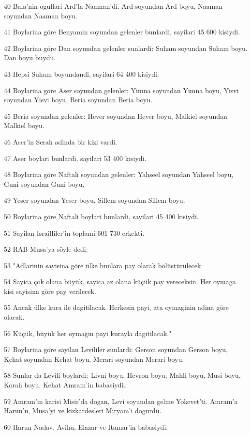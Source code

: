 \par 40 Bala'nin ogullari Ard'la Naaman'di. Ard soyundan Ard boyu, Naaman soyundan Naaman boyu.
\par 41 Boylarina göre Benyamin soyundan gelenler bunlardi, sayilari 45 600 kisiydi.
\par 42 Boylarina göre Dan soyundan gelenler sunlardi: Suham soyundan Suham boyu. Dan boyu buydu.
\par 43 Hepsi Suham boyundandi, sayilari 64 400 kisiydi.
\par 44 Boylarina göre Aser soyundan gelenler: Yimna soyundan Yimna boyu, Yisvi soyundan Yisvi boyu, Beria soyundan Beria boyu.
\par 45 Beria soyundan gelenler: Hever soyundan Hever boyu, Malkiel soyundan Malkiel boyu.
\par 46 Aser'in Serah adinda bir kizi vardi.
\par 47 Aser boylari bunlardi, sayilari 53 400 kisiydi.
\par 48 Boylarina göre Naftali soyundan gelenler: Yahseel soyundan Yahseel boyu, Guni soyundan Guni boyu,
\par 49 Yeser soyundan Yeser boyu, Sillem soyundan Sillem boyu.
\par 50 Boylarina göre Naftali boylari bunlardi, sayilari 45 400 kisiydi.
\par 51 Sayilan Israilliler'in toplami 601 730 erkekti.
\par 52 RAB Musa'ya söyle dedi:
\par 53 "Adlarinin sayisina göre ülke bunlara pay olarak bölüstürülecek.
\par 54 Sayica çok olana büyük, sayica az olana küçük pay vereceksin. Her oymaga kisi sayisina göre pay verilecek.
\par 55 Ancak ülke kura ile dagitilacak. Herkesin payi, ata oymaginin adina göre olacak.
\par 56 Küçük, büyük her oymagin payi kurayla dagitilacak."
\par 57 Boylarina göre sayilan Levililer sunlardi: Gerson soyundan Gerson boyu, Kehat soyundan Kehat boyu, Merari soyundan Merari boyu.
\par 58 Sunlar da Levili boylardi: Livni boyu, Hevron boyu, Mahli boyu, Musi boyu, Korah boyu. Kehat Amram'in babasiydi.
\par 59 Amram'in karisi Misir'da dogan, Levi soyundan gelme Yokevet'ti. Amram'a Harun'u, Musa'yi ve kizkardesleri Miryam'i dogurdu.
\par 60 Harun Nadav, Avihu, Elazar ve Itamar'in babasiydi.
